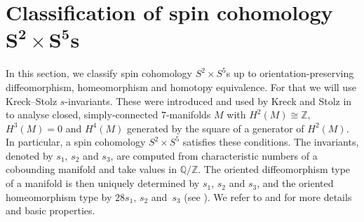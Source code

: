 \documentclass[pdftex]{sigma}
\numberwithin{equation}{section}
\theoremstyle{definition}
\numberwithin{table}{section}
\newcommand{\Z}{\mathbb{Z}}
\newcommand{\Q}{\mathbb{Q}}
\begin{document}
\section[Classification of spin cohomology S\^{}2 times S\^{}5s]{Classification of spin cohomology $\boldsymbol{S^2\times S^5}$s}\label{S:class}

In this section, we classify spin cohomology $S^2\times S^5$s up to orientation-preserving diffeomorphism, homeomorphism and homotopy equivalence. For that we will use Kreck--Stolz $s$-invariants. These were introduced and used by Kreck and Stolz in \cite{KS88,KS91,KS98} to analyse closed, simply-connected $7$-manifolds $M$ with $H^2(M)\cong \Z$, $H^3(M)=0$ and $H^4(M)$ generated by the square of a generator of $H^2(M)$. In particular, a spin cohomology $S^2\times S^5$ satisfies these conditions. The invariants, denoted by $s_1$, $s_2$ and $s_3$, are computed from characteristic numbers of a cobounding manifold and take values in $\Q/\Z$. The oriented diffeomorphism type of a manifold is then uniquely determined by $s_1$, $s_2$ and $s_3$, and the oriented homeomorphism type by $28s_1$, $s_2$ and~$s_3$ (see \cite[Section 3]{KS88}). We refer to \cite{KS88,KS91,KS98} and \cite[Section 2.2]{Xu25} for more details and basic properties.
\end{document}

